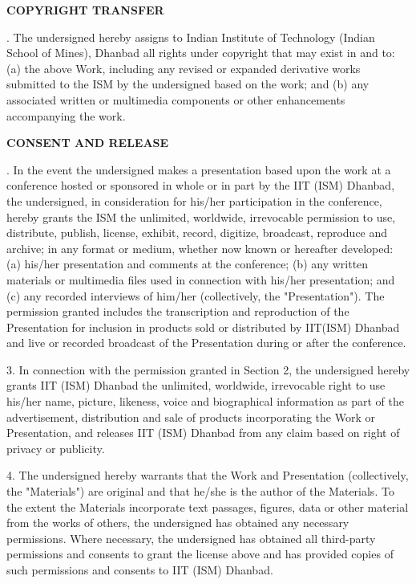 \begin{minipage}{\textwidth}
	\fontsize{12pt}{0pt}\selectfont \textbf{COPYRIGHT TRANSFER}
\end{minipage}

\begin{minipage}{\textwidth}
\fontsize{10pt}{0pt}.	The undersigned hereby assigns to Indian Institute of Technology (Indian School of Mines), Dhanbad all rights under copyright that may exist in and to: (a) the above Work, including any revised or expanded derivative works submitted to the ISM by the undersigned based on the work; and (b) any associated written or multimedia components or other enhancements accompanying the work.
\end{minipage}

\begin{minipage}{\textwidth}
\fontsize{12pt}{0pt}\selectfont \textbf{CONSENT AND RELEASE}
\end{minipage}

\begin{minipage}{\textwidth}
\fontsize{10pt}{0pt}.	In the event the undersigned makes a presentation based upon the work at a conference hosted or sponsored in whole or in part by the IIT (ISM) Dhanbad, the undersigned, in consideration for his/her participation in the conference, hereby grants the ISM the unlimited, worldwide, irrevocable permission to use, distribute, publish, license, exhibit, record, digitize, broadcast, reproduce and archive; in any format or medium, whether now known or hereafter developed: (a) his/her presentation and comments at the conference; (b) any written materials or multimedia files used in connection with his/her presentation; and (c) any recorded interviews of him/her (collectively, the "Presentation"). The permission granted includes the transcription and reproduction of the Presentation for inclusion in products sold or distributed by IIT(ISM) Dhanbad and live or recorded broadcast of the Presentation during or after the conference.

\vspace{0.2cm}

3.	In connection with the permission granted in Section 2, the undersigned hereby grants IIT (ISM) Dhanbad the unlimited, worldwide, irrevocable right to use his/her name, picture, likeness, voice and biographical information as part of the advertisement, distribution and sale of products incorporating the Work or Presentation, and releases IIT (ISM) Dhanbad from any claim based on right of privacy or publicity.

\vspace{0.2cm}

4.	The undersigned hereby warrants that the Work and Presentation (collectively, the "Materials") are original and that he/she is the author of the Materials. To the extent the Materials incorporate text passages, figures, data or other material from the works of others, the undersigned has obtained any necessary permissions. Where necessary, the undersigned has obtained all third-party permissions and consents to grant the license above and has provided copies of such permissions and consents to IIT (ISM) Dhanbad.
\end{minipage}

